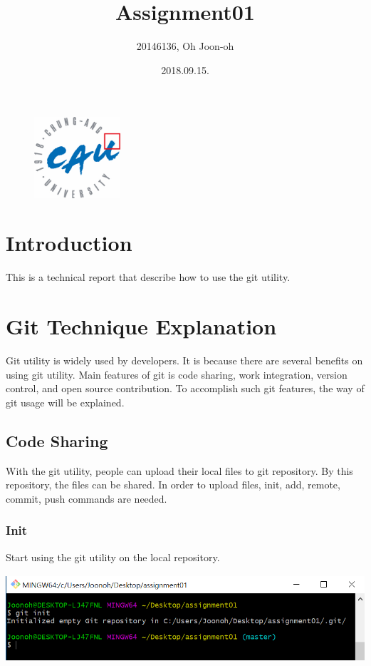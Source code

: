 \documentclass[18pt]{article}%
\begin{document}
\begin{figure}
\includegraphics[height=3cm]{logo.jpg}
\end{figure}
\title{Assignment01}
\author{20146136, Oh Joon-oh}
\date{2018.09.15.}
\maketitle
\section{Introduction}

This is a technical report that describe how to use the git utility.

\section{Git Technique Explanation}
Git utility is widely used by developers. It is because there are several benefits on using git utility. Main features of git is code sharing, work integration, version control, and open source contribution. To accomplish such git features, the way of git usage will be explained.

\subsection {Code Sharing}
With the git utility, people can upload their local files to git repository. By this repository, the files can be shared.
In order to upload files, init, add, remote, commit, push commands are needed.


\subsubsection {Init}
Start using the git utility on the local repository.\\
\includegraphics[height=4cm]{init.PNG}
\end{document}
